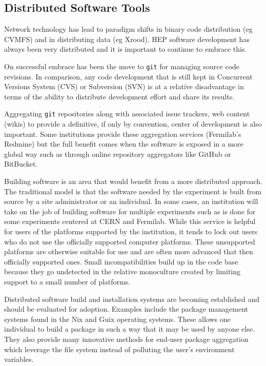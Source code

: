 \subsection{Distributed Software Tools}

Network technology has lead to paradigm shifts in binary code
distribution (eg CVMFS) and in distributing data (eg Xrood).  HEP
software development has always been very distributed and it is
important to continue to embrace this.

On successful embrace has been the move to \texttt{git} for managing source
code revisions.  In comparison, any code development that is still
kept in Concurrent Versions System (CVS) or Subversion (SVN) is at a
relative disadvantage in terms of the ability to distribute
development effort and share its results.

Aggregating \texttt{git} repositories along with associated issue trackers, web
content (wikis) to provide a definitive, if only by convention, center
of development is also important.  Some institutions provide these
aggregation services (Fermilab's Redmine) but the full benefit comes
when the software is exposed in a more global way such as through
online repository aggregators like GitHub or BitBucket.

Building software is an area that would benefit from a more
distributed approach.  The traditional model is that the software
needed by the experiment is built from source by a site administrator
or an individual.  In some cases, an institution will take on the job
of building software for multiple experiments such as is done for some
experiments centered at CERN and Fermilab.  While this service is
helpful for users of the platforms supported by the institution, it
tends to lock out users who do not use the officially supported
computer platforms.  These unsupported platforms are otherwise
suitable for use and are often more advanced that then officially
supported ones.  Small incompatibilities build up in the code base
because they go undetected in the relative monoculture created by
limiting support to a small number of platforms.

Distributed software build and installation systems are becoming
established and should be evaluated for adoption.  Examples include
the package management systems found in the Nix and Guix operating
systems.  These allows one individual to build a package in such a way
that it may be used by anyone else.  They also provide many innovative
methods for end-user package aggregation which leverage the file
system instead of polluting the user's environment variables.

